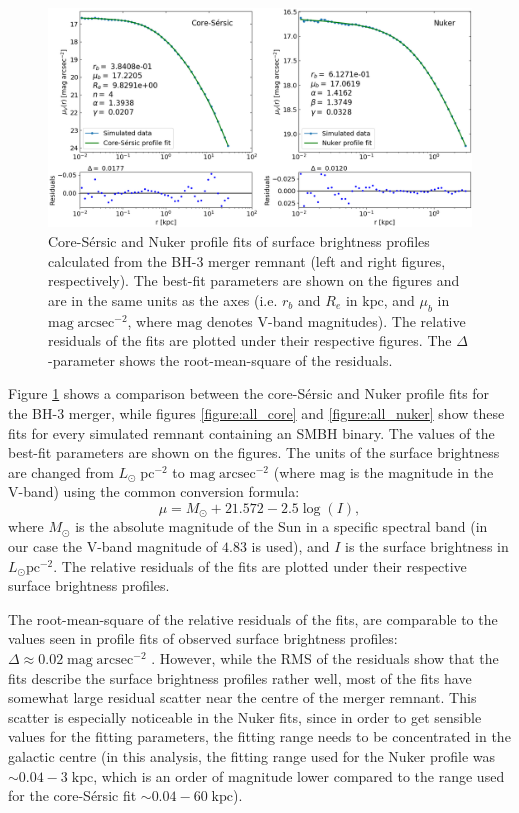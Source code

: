 \documentclass[english, twoside]{HYgradu}
\begin{document}
\begin{figure}
	\centering
	\includegraphics[width=\textwidth]{core_nuker_fits.png}
	\caption{Core-Sérsic and Nuker profile fits of surface brightness profiles calculated from the BH-3 merger remnant (left and right figures, respectively). The best-fit parameters are shown on the figures and are in the same units as the axes (i.e. $r_b$ and $R_e$ in $\mathrm{kpc}$, and $\mu_b$ in $\mathrm{mag \; arcsec^{-2}}$, where $\mathrm{mag}$ denotes V-band magnitudes). The relative residuals of the fits are plotted under their respective figures. The $\Delta$-parameter shows the root-mean-square of the residuals.}
	\label{figure:core_nuker}
\end{figure}

Figure \ref{figure:core_nuker} shows a comparison between the core-Sérsic and Nuker profile fits for the BH-3 merger, while figures \ref{figure:all_core} and \ref{figure:all_nuker} show these fits for every simulated remnant containing an SMBH binary. The values of the best-fit parameters are shown on the figures. The units of the surface brightness are changed from $L_\odot \; \mathrm{pc^{-2}}$ to $\mathrm{mag \; arcsec^{-2}}$ (where $\mathrm{mag}$ is the magnitude in the V-band) using the common conversion formula:
\begin{equation}
\mu = M_\odot + 21.572 - 2.5 \log(I), 
\end{equation}
where $M_\odot$ is the absolute magnitude of the Sun in a specific spectral band (in our case the V-band magnitude of $4.83$ is used), and $I$ is the surface brightness in $L_\odot \mathrm{pc^{-2}}$. The relative residuals of the fits are plotted under their respective surface brightness profiles.

The root-mean-square of the relative residuals of the fits, are comparable to the values seen in profile fits of observed surface brightness profiles: $\Delta \approx 0.02 \; \mathrm{mag \; arcsec^{-2}}$ \citep{Dullo2012}. However, while the RMS of the residuals show that the fits describe the surface brightness profiles rather well, most of the fits have somewhat large residual scatter near the centre of the merger remnant. This scatter is especially noticeable in the Nuker fits, since in order to get sensible values for the fitting parameters, the fitting range needs to be concentrated in the galactic centre (in this analysis, the fitting range used for the Nuker profile was $\sim 0.04 - 3 \; \mathrm{kpc}$, which is an order of magnitude lower compared to the range used for the core-Sérsic fit $\sim 0.04 - 60 \; \mathrm{kpc}$). 
\end{document}
